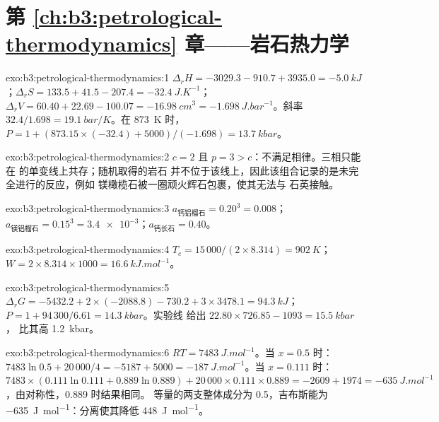 \section*{第 \ref{ch:b3:petrological-thermodynamics} 章——岩石热力学}

\begin{solution}{exo:b3:petrological-thermodynamics:1}
$\Delta_rH = -3029.3 - 910.7 + 3935.0 = \qty{-5.0}{kJ}$；$\Delta_rS = 133.5 +
41.5 - 207.4 = \qty{-32.4}{J.K^{-1}}$；$\Delta_rV = 60.40 + 22.69 - 100.07 =
\qty{-16.98}{cm^3} = \qty{-1.698}{J.bar^{-1}}$。斜率 $32.4/1.698 =
\qty{19.1}{bar/K}$。在 \qty{873}{K} 时，$P = 1 + (873.15\times(-32.4) +
5000)/(-1.698) = \qty{13.7}{kbar}$。
\end{solution}

\begin{solution}{exo:b3:petrological-thermodynamics:2}
$c = 2$ 且 $p = 3 > c$：不满足相律。三相只能在
 的单变线上共存；随机取得的岩石
并不位于该线上，因此该组合记录的是未完全进行的反应，例如
镁橄榄石被一圈顽火辉石包裹，使其无法与
石英接触。
\end{solution}

\begin{solution}{exo:b3:petrological-thermodynamics:3}
$a_{\text{钙铝榴石}} = 0.20^3 = 0.008$；$a_{\text{镁铝榴石}} = 0.15^3 =
\num{3.4e-3}$；$a_{\text{钙长石}} = 0.40$。
\end{solution}

\begin{solution}{exo:b3:petrological-thermodynamics:4}
$T_c = 15\,000/(2\times8.314) = \qty{902}{K}$；$W = 2\times8.314\times1000
= \qty{16.6}{kJ.mol^{-1}}$。
\end{solution}

\begin{solution}{exo:b3:petrological-thermodynamics:5}
$\Delta_rG = -5432.2 + 2\times(-2088.8) - 730.2 + 3\times3478.1 =
\qty{94.3}{kJ}$；$P = 1 + 94\,300/6.61 = \qty{14.3}{kbar}$。实验线
给出 $22.80\times726.85 - 1093 = \qty{15.5}{kbar}$，
比其高 \qty{1.2}{kbar}。
\end{solution}

\begin{solution}{exo:b3:petrological-thermodynamics:6}
$RT = \qty{7483}{J.mol^{-1}}$。当 $x = 0.5$ 时：$7483\ln0.5 + 20\,000/4 = -5187 +
5000 = \qty{-187}{J.mol^{-1}}$。当 $x = 0.111$ 时：$7483\times(0.111\ln0.111 +
0.889\ln0.889) + 20\,000\times0.111\times0.889 = -2609 + 1974 =
\qty{-635}{J.mol^{-1}}$，由对称性，0.889 时结果相同。
等量的两支整体成分为 0.5，吉布斯能为
\qty{-635}{J.mol^{-1}}：分离使其降低 \qty{448}{J.mol^{-1}}。
\end{solution}

